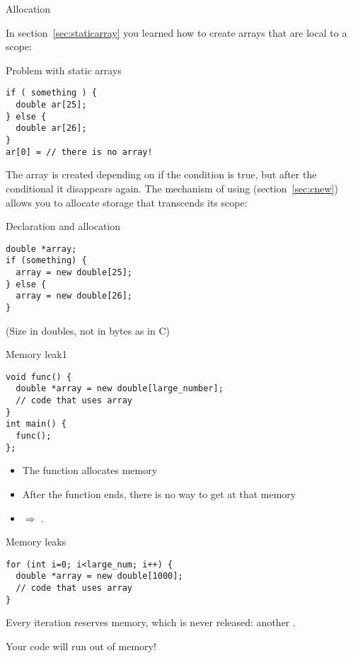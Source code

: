  {Allocation}

In section~\ref{sec:staticarray} you learned how to create arrays that
are local to a scope:

\begin{block}{Problem with static arrays}
  \label{sl:no-static-alloc}
\begin{lstlisting}
if ( something ) {
  double ar[25];
} else {
  double ar[26];
}
ar[0] = // there is no array!
\end{lstlisting}
\end{block}

The array  is created depending on if the condition is true, but
after
the conditional it disappears again. The mechanism of using
 (section~\ref{sec:cnew}) allows you to allocate
storage that transcends its scope:

\begin{block}{Declaration and allocation}
  \label{sl:c-array-new}
\begin{lstlisting}
double *array;
if (something) {
  array = new double[25];
} else {
  array = new double[26];
}
\end{lstlisting}
(Size in doubles, not in bytes as in C)
\end{block}

\begin{block}{Memory leak1}
  \label{sl:leak1}
\begin{lstlisting}
void func() {
  double *array = new double[large_number];
  // code that uses array
}
int main() {
  func();
};
\end{lstlisting}
\begin{itemize}
\item
  The function allocates memory
\item After the function ends, there is no way to get at that memory
\item $\Rightarrow$ .
\end{itemize}

\end{block}

\begin{block}{Memory leaks}
  \label{sl:leak2}
\begin{lstlisting}
for (int i=0; i<large_num; i++) {
  double *array = new double[1000];
  // code that uses array
}
\end{lstlisting}
  Every iteration reserves memory, which is never released:
  another .

  Your code will run out of memory!
\end{block}

